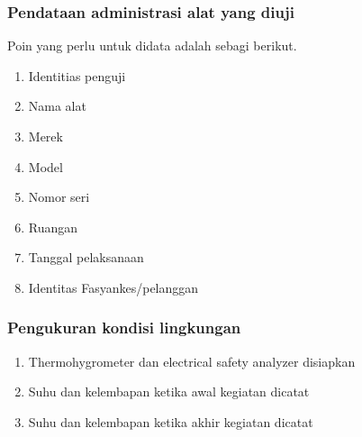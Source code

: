 \documentclass{article}
\begin{document}
	\subsubsection{Pendataan administrasi alat yang diuji}
	Poin yang perlu untuk didata adalah sebagi berikut.
	\begin{enumerate}
		\item Identitias penguji
		\item Nama alat
		\item Merek
		\item Model
		\item Nomor seri
		\item Ruangan
		\item Tanggal pelaksanaan
		\item Identitas Fasyankes/pelanggan
	\end{enumerate}
	
	\subsubsection{Pengukuran kondisi lingkungan}
	\begin{enumerate}
		\item Thermohygrometer dan electrical safety analyzer disiapkan 
		\item Suhu dan kelembapan ketika awal kegiatan dicatat
		\item Suhu dan kelembapan ketika akhir kegiatan dicatat
	\end{enumerate}
	
\end{document}
